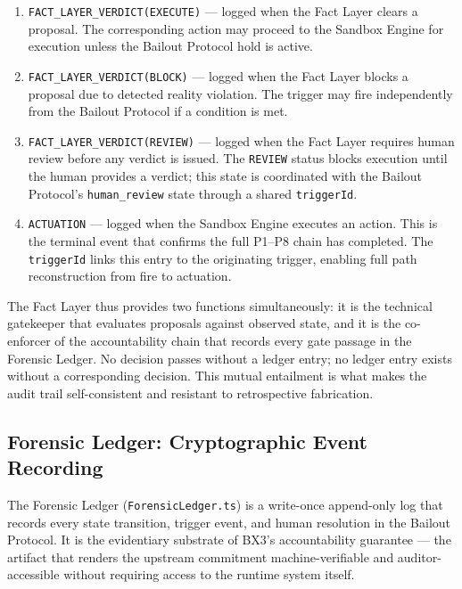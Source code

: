 \begin{enumerate}
  \item \texttt{FACT\_LAYER\_VERDICT(EXECUTE)} --- logged when the Fact Layer
        clears a proposal.  The corresponding action may proceed to the
        Sandbox Engine for execution unless the Bailout Protocol hold is active.
  \item \texttt{FACT\_LAYER\_VERDICT(BLOCK)} --- logged when the Fact Layer
        blocks a proposal due to detected reality violation.  The trigger
        may fire independently from the Bailout Protocol if a condition is met.
  \item \texttt{FACT\_LAYER\_VERDICT(REVIEW)} --- logged when the Fact Layer
        requires human review before any verdict is issued.  The
        \texttt{REVIEW} status blocks execution until the human provides
        a verdict; this state is coordinated with the Bailout Protocol's
        \texttt{human\_review} state through a shared \texttt{triggerId}.
  \item \texttt{ACTUATION} --- logged when the Sandbox Engine executes an
        action.  This is the terminal event that confirms the full
        P1--P8 chain has completed.  The \texttt{triggerId} links this entry
        to the originating trigger, enabling full path reconstruction from
        fire to actuation.
\end{enumerate}

The Fact Layer thus provides two functions simultaneously: it is the
technical gatekeeper that evaluates proposals against observed state, and it
is the co-enforcer of the accountability chain that records every gate passage
in the Forensic Ledger.  No decision passes without a ledger entry; no ledger
entry exists without a corresponding decision.  This mutual entailment is what
makes the audit trail self-consistent and resistant to retrospective fabrication.

\subsection{Forensic Ledger: Cryptographic Event Recording}

The Forensic Ledger (\texttt{ForensicLedger.ts}) is a write-once append-only
log that records every state transition, trigger event, and human resolution
in the Bailout Protocol.  It is the evidentiary substrate of BX3's accountability
guarantee --- the artifact that renders the upstream commitment machine-verifiable
and auditor-accessible without requiring access to the runtime system itself.

